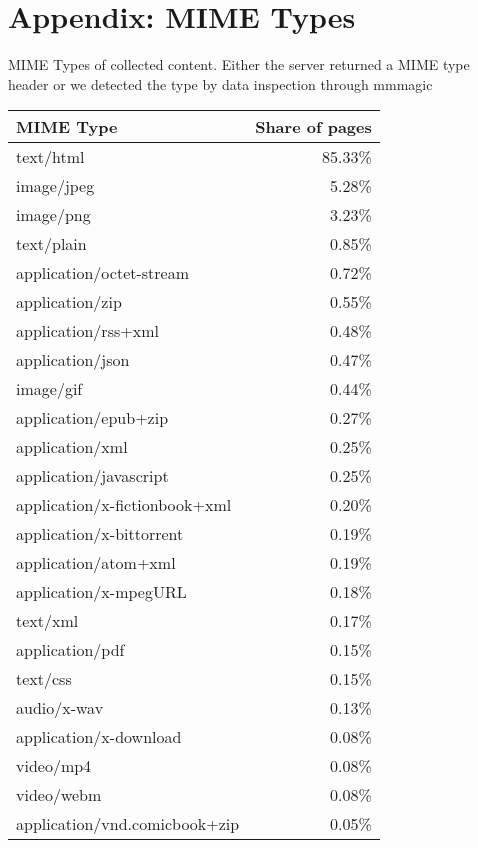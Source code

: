 \newpage
%
%
\section{Appendix: MIME Types}
\label{appendix:A}
MIME Types of collected content. Either the server returned a MIME type header or we detected the type by data inspection through mmmagic\cite{mscdex}
\iflncs
\begin{center}
\label{table:mime types}
\begin{tabular*}{\textwidth}{l@{\extracolsep{\fill}}r}
    \textbf{MIME Type} & \textbf{Share of pages}\\
	\hline
	\hline
	text/html			&	85.33\% \\
	\hline
	image/jpeg			&	5.28\% \\
	\hline
	image/png			&	3.23\% \\
	\hline
	text/plain			&	0.85\% \\
	\hline
	application/octet-stream		&	0.72\% \\
	\hline
	application/zip		&	0.55\% \\
	\hline
	application/rss+xml	&	0.48\% \\
	\hline
	application/json	&	0.47\% \\
	\hline
	image/gif			&	0.44\% \\
	\hline
	application/epub+zip			&	0.27\% \\
	\hline
	application/xml		&	0.25\% \\
	\hline
	application/javascript			&	0.25\% \\
	\hline
	application/x-fictionbook+xml	&	0.20\% \\
	\hline
	application/x-bittorrent		&	0.19\% \\
	\hline
	application/atom+xml			&	0.19\% \\
	\hline
	application/x-mpegURL			&	0.18\% \\
	\hline
	text/xml			&	0.17\% \\
	\hline
	application/pdf		&	0.15\% \\
	\hline
	text/css			&	0.15\% \\
	\hline
	audio/x-wav			&	0.13\% \\
	\hline
	application/x-download			&	0.08\% \\
	\hline
	video/mp4			&	0.08\% \\
	\hline
	video/webm			&	0.08\% \\
	\hline
	application/vnd.comicbook+zip	&	0.05\% \\

\end{tabular*}
\end{center}
